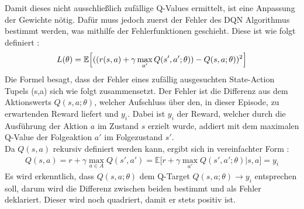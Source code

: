 Damit dieses nicht ausschließlich zufällige Q-Values ermittelt, ist eine Anpassung der Gewichte nötig. Dafür muss jedoch zuerst der Fehler des DQN Algorithmus bestimmt werden, was mithilfe der Fehlerfunktionen geschieht. Diese ist wie folgt definiert \citep[S.146 f.]{DRL_Lapan}:
\begin{align}
	L(\theta) = \mathbb{E} \Bigl\lbrack ((r(s,a) +\gamma \max_{a'}Q(s',a';\theta)) - Q(s,a;\theta))^2 \Bigr\rbrack
	\label{eq:DQN_Loss}
\end{align}
Die Formel  besagt, dass der Fehler eines zufällig ausgesuchten State-Action Tupels (s,a) sich wie folgt zusammensetzt. 
Der Fehler ist die Differenz aus dem Aktionswerts $Q(s,a; \theta)$, welcher Aufschluss über den, in dieser Episode, zu erwartenden Reward liefert und $y_i$. Dabei ist $y_i$ der Reward, welcher durch die Ausführung der Aktion $a$ im Zustand $s$ erzielt wurde, addiert mit dem maximalen Q-Value der Folgeaktion $a'$ im Folgezustand $s'$.\\
Da $Q(s,a)$ rekursiv definiert werden kann, ergibt sich in vereinfachter Form \citep[S.126 und S. 146 f.]{DRL_Lapan}:
\begin{align}
	Q(s,a) = r + \gamma \max_{a \in A}Q(s',a') = \mathbb{E} \bigl\lbrack r+\gamma \max_{a'}Q(s',a';\theta)|s,a \bigr\rbrack = y_i
	\label{eq:Q-Value_rekursive_def}
\end{align}
Es wird erkenntlich, dass $Q(s,a;\theta)$ dem Q-Target $Q(s,a;\theta) \longrightarrow y_i$ entsprechen soll, darum wird die Differenz zwischen beiden bestimmt und als Fehler deklariert. Dieser wird noch quadriert, damit er stets positiv ist.

